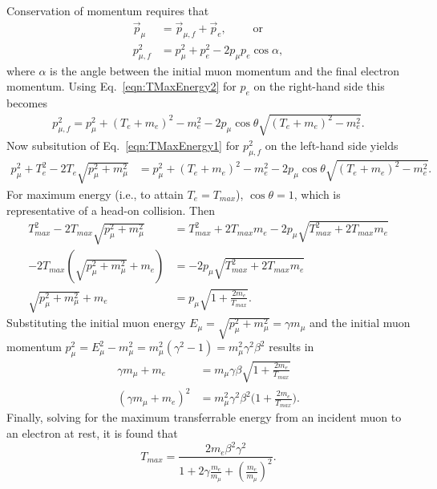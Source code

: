 Conservation of momentum requires that
\begin{align*}
\vec{p}_\mu&=\vec{p}_{\mu,f}+\vec{p}_e, \qquad\text{ or}\\
 p_{\mu,f}^2&=p_\mu ^2 + p_e^2-2p_\mu p_e \cos\alpha,
\end{align*}
where $\alpha$ is the angle between the initial muon momentum and the final electron momentum.
Using Eq.~\eqref{eqn:TMaxEnergy2} for $p_e$ on the right-hand side this becomes
\begin{align*}
p_{\mu,f}^2=p_\mu ^2+(T_e+m_e)^2-m_e ^2-2p_\mu\cos\theta \sqrt{(T_e+m_e)^2-m_e^2}.
\end{align*}
Now subsitution of Eq.~\eqref{eqn:TMaxEnergy1} for $p_{\mu,f} ^2$ on the left-hand side yields
\begin{align*}
p_\mu ^2+T_e ^2 - 2T_e \sqrt{p_\mu^2+m_\mu ^2}&=p_\mu ^2+(T_e+m_e)^2-m_e ^2 -2p_\mu\cos\theta\sqrt{(T_e+m_e)^2-m_e^2}.
\end{align*}
For maximum energy (i.e., to attain $T_e=T_{max}$), $\cos\theta=1$, which is representative of a head-on collision. Then
\begin{align*}
T_{max} ^2-2T_{max}\sqrt{p_\mu ^2+m_\mu ^2} &=T_{max}^2+2T_{max}m_e-2p_\mu\sqrt{T_{max}^2+2T_{max}m_e}\\
-2T_{max}(\sqrt{p_\mu ^2 + m_\mu ^2}+m_e)&=-2p_\mu\sqrt{T_{max}^2+2T_{max}m_e}\\
\sqrt{p_\mu ^2+m_\mu ^2}+m_e&=p_\mu\sqrt{1+\frac{2m_e}{T_{max}}}.
\end{align*}
Substituting the initial muon energy $E_\mu=\sqrt{p_\mu ^2+m_\mu ^2}=\gamma m_\mu$ and the initial muon momentum $p_\mu ^2=E_\mu ^2 - m_\mu ^2 = m_\mu ^2 (\gamma^2-1)=m_\mu ^2 \gamma^2 \beta^2$ results in
\begin{align*}
\gamma m_\mu + m_e &= m_\mu\gamma\beta\sqrt{1+\frac{2m_e}{T_{max}}}\\
(\gamma m_\mu +m_e)^2 &=m_\mu^2\gamma^2\beta^2 \Big(1+\frac{2m_e}{T_{max}}\Big).
\end{align*}
Finally, solving for the maximum transferrable energy from an incident muon to an electron at rest, it is found that
\begin{equation}\label{eqn:tmax}
T_{max}=\frac{2m_e \beta^2 \gamma^2}{1+2\gamma\frac{m_e}{m_\mu}+(\frac{m_e}{m_\mu})^2}.
\end{equation}

